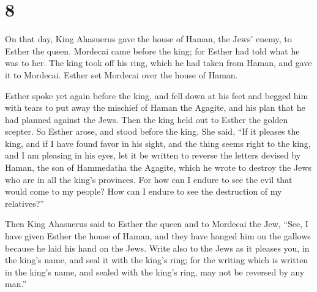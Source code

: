 \hypertarget{section-7}{%
\section{8}\label{section-7}}

 On that day, King Ahasuerus gave the house of Haman, the
Jews' enemy, to Esther the queen. Mordecai came before the king; for
Esther had told what he was to her.  The king took off his
ring, which he had taken from Haman, and gave it to Mordecai. Esther set
Mordecai over the house of Haman.

 Esther spoke yet again before the king, and fell down at
his feet and begged him with tears to put away the mischief of Haman the
Agagite, and his plan that he had planned against the Jews. 
Then the king held out to Esther the golden scepter. So Esther arose,
and stood before the king.  She said, ``If it pleases the
king, and if I have found favor in his sight, and the thing seems right
to the king, and I am pleasing in his eyes, let it be written to reverse
the letters devised by Haman, the son of Hammedatha the Agagite, which
he wrote to destroy the Jews who are in all the king's provinces.
 For how can I endure to see the evil that would come to my
people? How can I endure to see the destruction of my relatives?''

 Then King Ahasuerus said to Esther the queen and to
Mordecai the Jew, ``See, I have given Esther the house of Haman, and
they have hanged him on the gallows because he laid his hand on the
Jews.  Write also to the Jews as it pleases you, in the
king's name, and seal it with the king's ring; for the writing which is
written in the king's name, and sealed with the king's ring, may not be
reversed by any man.''

